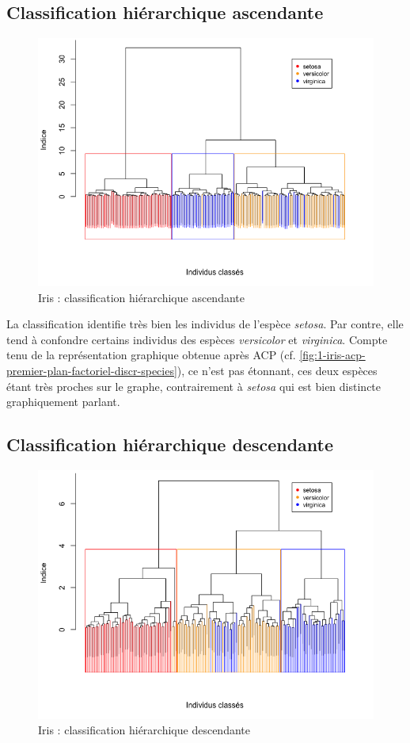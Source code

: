 \documentclass[a4paper,10pt]{report}
\begin{document}
\subsection{Classification hiérarchique ascendante}

\begin{figure}[H]
	\centering
	\captionsetup{justification=centering, margin=3cm}
	\includegraphics[width=.6\linewidth]{img/2-2-1-iris-class-hierarchique-asc}
	\caption{Iris : classification hiérarchique ascendante}
	\label{2-2-1-iris-class-hierarchique-asc}%
\end{figure}

La classification identifie très bien les individus de l'espèce \textit{setosa}. Par contre, elle tend à confondre certains individus des espèces \textit{versicolor} et \textit{virginica}. Compte tenu de la représentation graphique obtenue après ACP (cf. \autoref{fig:1-iris-acp-premier-plan-factoriel-discr-species}), ce n'est pas étonnant, ces deux espèces étant très proches sur le graphe, contrairement à \textit{setosa} qui est bien distincte graphiquement parlant.


\subsection{Classification hiérarchique descendante}

\begin{figure}[H]
	\centering
	\captionsetup{justification=centering, margin=3cm}
	\includegraphics[width=.6\linewidth]{img/2-2-1-iris-class-hierarchique-desc}
	\caption{Iris : classification hiérarchique descendante}
	\label{2-2-1-iris-class-hierarchique-desc}%
\end{figure}
\end{document}
